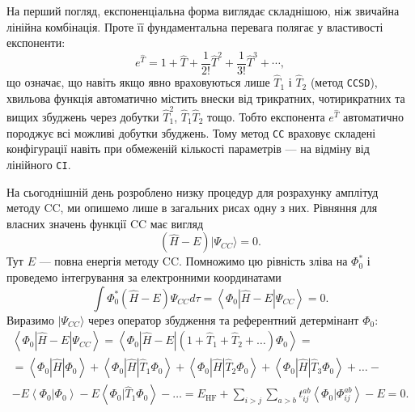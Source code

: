 \begin{commentbox}
На перший погляд, експоненціальна форма виглядає складнішою, ніж
звичайна лінійна комбінація. Проте її фундаментальна перевага полягає
у властивості експоненти:
\begin{equation}
    e^{\hat{T}} = 1 + \hat{T} + \frac{1}{2!}\hat{T}^2 +
    \frac{1}{3!}\hat{T}^3 + \cdots,
\end{equation}
що означає, що навіть якщо явно враховуються лише \(\hat{T}_1\) і \(\hat{T}_2\)
(метод \texttt{CCSD}), хвильова функція автоматично містить внески від
трикратних, чотирикратних та вищих збуджень через добутки
\(\hat{T}_1^2\), \(\hat{T}_1\hat{T}_2\) тощо. Тобто експонента  $e^{\hat{T}}$ автоматично породжує всі можливі добутки збуджень. Тому метод \texttt{CC} враховує складені конфігурації навіть при обмеженій кількості параметрів ---
на відміну від лінійного \texttt{CI}.
\end{commentbox}

На сьогоднішній день розроблено низку процедур для розрахунку амплітуд методу CC, ми опишемо лише в загальних рисах одну з них. Рівняння для власних значень функції CC має вигляд
\begin{equation*}
(\widehat{H} - E) | \Psi_{CC} \rangle = 0.
\end{equation*}
Тут \( E \) --- повна енергія методу CC. Помножимо цю рівність зліва на \( \Phi_0^* \) і проведемо інтегрування за електронними координатами
\begin{equation*}
\int \Phi_0^* (\widehat{H} - E) \Psi_{CC} d\tau = \left\langle \Phi_0 | \widehat{H} - E | \Psi_{CC} \right\rangle = 0.
\end{equation*}
Виразимо \( | \Psi_{CC} \rangle \) через оператор збудження та референтний детермінант \( \Phi_0 \):
\begin{multline}\label{eq:CC-l}
 \left\langle \Phi_0 | \widehat{H} - E | \Psi_{CC} \right\rangle = \left\langle \Phi_0 | \widehat{H} - E | (1 + \widehat{T}_1 + \widehat{T}_2 + \ldots) \Phi_0 \right\rangle = \\
 =\left\langle \Phi_0 | \widehat{H} | \Phi_0 \right\rangle + \left\langle \Phi_0 | \widehat{H} | \widehat{T}_1 \Phi_0 \right\rangle + \left\langle \Phi_0 | \widehat{H} | \widehat{T}_2 \Phi_0 \right\rangle + \left\langle \Phi_0 | \widehat{H} | \widehat{T}_3 \Phi_0 \right\rangle + \ldots - \\
- E \left\langle \Phi_0 | \Phi_0 \right\rangle - E \left\langle \Phi_0 | \widehat{T}_1 \Phi_0 \right\rangle - \ldots
= E_{\text{HF}} + \sum_{i>j} \sum_{a>b} t_{ij}^{ab} \left\langle \Phi_0 | \Phi_{ij}^{ab} \right\rangle - E = 0.
\end{multline}


